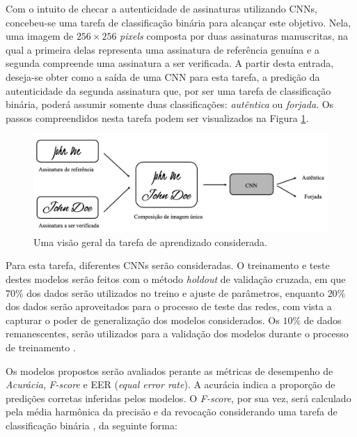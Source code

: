 


Com o intuito de checar a autenticidade de assinaturas utilizando CNNs, concebeu-se uma tarefa de classificação binária para alcançar este objetivo. Nela, uma imagem de $256 \times 256$ \emph{pixels} composta por duas assinaturas manuscritas, na qual a primeira delas representa uma assinatura de referência genuína e a segunda compreende uma assinatura a ser verificada. A partir desta entrada, deseja-se obter como a saída de uma CNN para esta tarefa, a predição da autenticidade da segunda assinatura que, por ser uma tarefa de classificação binária, poderá assumir somente duas classificações: \emph{autêntica} ou \emph{forjada}. Os passos compreendidos nesta tarefa podem ser visualizados na Figura \ref{fig:esquema-solucao}.

\begin{figure}[h!]
  \centering
  \caption{Uma visão geral da tarefa de aprendizado considerada.}
  \label{fig:esquema-solucao}
  \includegraphics[width=\textwidth]{imgs/esquema-solucao}
\end{figure}

Para esta tarefa, diferentes CNNs serão consideradas. O treinamento e teste destes modelos serão feitos com o método \emph{holdout} de validação cruzada, em que $70\%$ dos dados serão utilizados no treino e ajuste de parâmetros, enquanto $20\%$ dos dados serão aproveitados para o processo de teste das redes, com vista a capturar o poder de generalização dos modelos considerados. Os $10\%$ de dados remanescentes, serão utilizados para a validação dos modelos durante o processo de treinamento \cite{brink}.

Os modelos propostos serão avaliados perante as métricas de desempenho de \emph{Acurácia}, \emph{F-score} e EER (\emph{equal error rate}). A acurácia indica a proporção de predições corretas inferidas pelos modelos. O \emph{F-score}, por sua vez, será calculado pela média harmônica da precisão e da revocação considerando uma tarefa de classificação binária \cite{marsland}, da seguinte forma:

